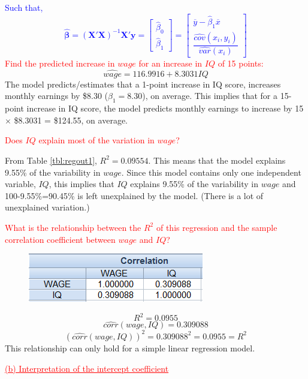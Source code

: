 \documentclass[12pt]{report}
\newenvironment{blueframed}[1][blue]
{\def\FrameCommand{\fboxsep=\FrameSep\fcolorbox{#1}{white}}%
\MakeFramed {\advance\hsize-\width \FrameRestore}}
{\endMakeFramed}
\begin{document}
\begin{blueframed}
	\noindent \textcolor{blue}{Such that, $$\widehat{\boldsymbol{\beta}} =(\textbf{X}'\textbf{X})^{-1}\textbf{X}'\textbf{y}=\begin{bmatrix}
		\hat{\beta}_0 \\
		\hat{\beta}_1 
		\end{bmatrix} = \begin{bmatrix}
		\overline{y} - \hat{\beta}_1 \overline{x} \\
		\dfrac{\widehat{cov}(x_i , y_i)}{\widehat{var}(x_i)}
		\end{bmatrix}$$
	}
\end{blueframed}
\noindent \textcolor{red}{Find the predicted increase in $wage$ for an increase in $IQ$ of 15 points:}
$$\widehat{wage} = 116.9916+8.3031IQ$$
\noindent The model predicts/estimates that a 1-point increase in IQ score, increases monthly earnings by \$8.30 ($\hat{\beta}_1 = 8.30$), on average.
\noindent This implies that for a 15-point increase in IQ score, the model predicts monthly earnings to increase by 15 $\times$ \$8.3031 = \$124.55, on average.

\noindent \textcolor{red}{Does $IQ$ explain most of the variation in $wage$?}

\noindent From Table \ref{tbl:regout1}, $R^2 = 0.09554$. This means that the model explains 9.55\% of the variability in $wage$. Since this model contains only one independent variable, $IQ$, this implies that $IQ$ explains 9.55\% of the variability in $wage$ and 100-9.55\%=90.45\% is left unexplained by the model. (There is a lot of unexplained variation.)

\noindent \textcolor{red}{What is the relationship between the $R^2$ of this regression and the sample correlation coefficient between $wage$ and $IQ$?}
\begin{figure}[H]
	\centering
	\includegraphics{q3_32}
\end{figure}
\vspace{-\baselineskip} 
$$R^2 = 0.0955$$
$$\widehat{corr}(wage,IQ) = 0.309088$$
$$(\widehat{corr}(wage,IQ))^2 = 0.309088^2 = 0.0955 = R^2$$
\noindent This relationship can only hold for a simple linear regression model.

\noindent \textcolor{red}{\underline{(b) Interpretation of the intercept coefficient}}
\end{document}
